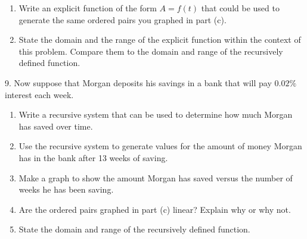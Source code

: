 \documentclass[10pt,]{book}
\theoremstyle{plain}
\theoremstyle{definition}
\theoremstyle{definition}
\theoremstyle{definition}
\numberwithin{equation}{section}
\begin{document}
\begin{exerciselist}
\begin{enumerate}[label=(\alph*)]
\item\hypertarget{li-38}{}Write an explicit function of the form \(A=f(t)\) that could be used to generate the same ordered pairs you graphed in part (c).%
\item\hypertarget{li-39}{}State the domain and the range of the explicit function within the context of this problem.  Compare them to the domain and range of the recursively defined function.%
\end{enumerate}
%
\par\smallskip
\item[9.]\hypertarget{exercise-11}{}Now suppose that Morgan deposits his savings in a bank that will pay \(0.02\%\) interest each week. \leavevmode%
\begin{enumerate}[label=(\alph*)]
\item\hypertarget{li-40}{}Write a recursive system that can be used to determine how much Morgan has saved over time.%
\item\hypertarget{li-41}{}Use the recursive system to generate values for the amount of money Morgan has in the bank after 13 weeks of saving.%
\item\hypertarget{li-42}{}Make a graph to show the amount Morgan has saved versus the number of weeks he has been saving.%
\item\hypertarget{li-43}{}Are the ordered pairs graphed in part (c) linear?  Explain why or why not.%
\item\hypertarget{li-44}{}State the domain and range of the recursively defined function.%
\end{enumerate}
%
\par\smallskip
\end{exerciselist}
\typeout{************************************************}
\typeout{************************************************}
\end{document}
